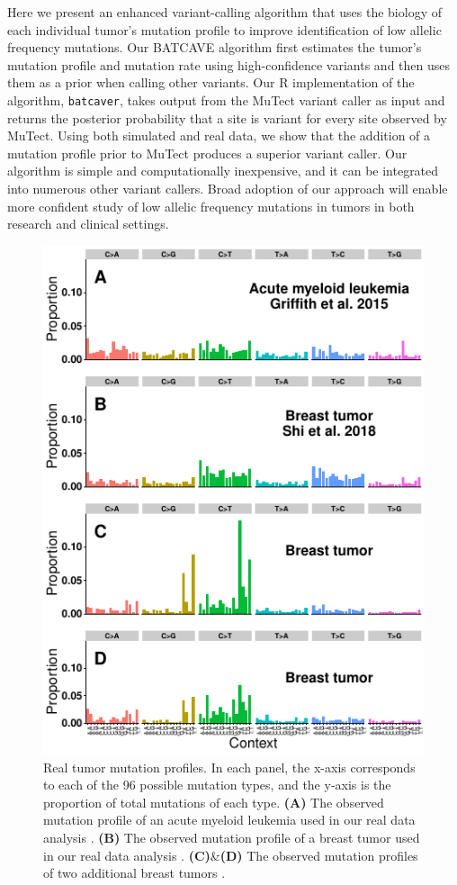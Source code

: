 \documentclass[a4,center,fleqn]{NAR}
\newcommand{\batcave}{BATCAVE\xspace}
\begin{document}
Here we present an enhanced variant-calling algorithm that uses the biology of each individual tumor's mutation profile to improve identification of low allelic frequency mutations.
Our \batcave algorithm first estimates the tumor's mutation profile and mutation rate using high-confidence variants and then uses them as a prior when calling other variants.
Our R implementation of the algorithm, \texttt{batcaver}, takes output from the MuTect variant caller as input and returns the posterior probability that a site is variant for every site observed by MuTect.
Using both simulated and real data, we show that the addition of a mutation profile prior to MuTect produces a superior variant caller.
Our algorithm is simple and computationally inexpensive, and it can be integrated into numerous other variant callers.
Broad adoption of our approach will enable more confident study of low allelic frequency mutations in tumors in both research and clinical settings.

\begin{figure}
\centering
  \includegraphics{figures/real_signatures_only.pdf}
  \caption{Real tumor mutation profiles.
  In each panel, the x-axis corresponds to each of the 96 possible mutation types, and the y-axis is the proportion of total mutations of each type.
  \textbf{(A)} The observed mutation profile of an acute myeloid leukemia used in our real data analysis \cite{Griffith2015}.
  \textbf{(B)} The observed mutation profile of a breast tumor used in our real data analysis \cite{Shi2018}.
  \textbf{(C)}\&\textbf{(D)} The observed mutation profiles of two additional breast tumors \cite{Alexandrov2019}.
   }
  \label{NAR-realsigfig}
 \end{figure}
\end{document}
